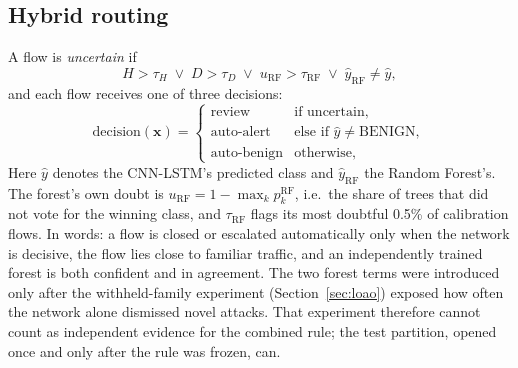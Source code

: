 \documentclass[conference]{IEEEtran}
\begin{document}
\subsection{Hybrid routing}
A flow is \emph{uncertain} if
\begin{equation}
H>\tau_H \;\lor\; D>\tau_D \;\lor\; u_{\mathrm{RF}}>\tau_{\mathrm{RF}} \;\lor\; \hat{y}_{\mathrm{RF}}\neq\hat{y},
\end{equation}
and each flow receives one of three decisions:
\begin{equation}
\text{decision}(\mathbf{x}) =
\begin{cases}
\text{review} & \text{if uncertain},\\
\text{auto-alert} & \text{else if } \hat{y}\neq\text{BENIGN},\\
\text{auto-benign} & \text{otherwise,}
\end{cases}
\end{equation}
Here $\hat{y}$ denotes the CNN-LSTM's predicted class and $\hat{y}_{\mathrm{RF}}$ the Random
Forest's. The forest's own doubt is $u_{\mathrm{RF}} = 1-\max_k p^{\mathrm{RF}}_k$, i.e.\ the
share of trees that did not vote for the winning class, and $\tau_{\mathrm{RF}}$ flags its most
doubtful 0.5\% of calibration flows. In words: a flow is closed or escalated automatically only
when the network is decisive, the flow lies close to familiar traffic, and an independently
trained forest is both confident and in agreement. The two forest terms were introduced only after
the withheld-family experiment (Section~\ref{sec:loao}) exposed how often the network alone
dismissed novel attacks. That experiment therefore cannot count as independent evidence for the
combined rule; the test partition, opened once and only after the rule was frozen, can.
\end{document}

